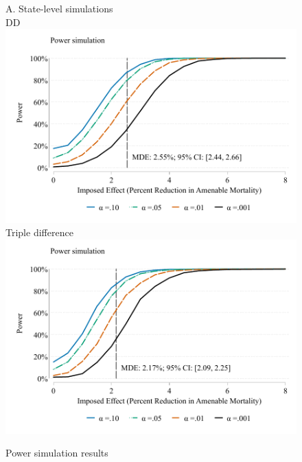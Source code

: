 \documentclass[12pt]{article}%
\begin{document}
   \begin{figure}
    \caption{Power simulation results}
     \begin{minipage}{\linewidth}
    \begin{minipage}{.5\linewidth}
    A. State-level simulations\\
    \centering
     DD\\
      \includegraphics[width=\linewidth]{../output/figures/power_st_dd_ln_amen_55_64_cluster_state_weight_attpop_controls_yes_preperiod_2001_2010.pdf}\\
     Triple difference\\
      \includegraphics[width=\linewidth]{../output/figures/power_st_ddd_ln_amen_none_cluster_state_weight_attpop_controls_yes_preperiod_2001_2010.pdf}

\end{minipage}
\end{minipage}
\end{figure}
\end{document}
